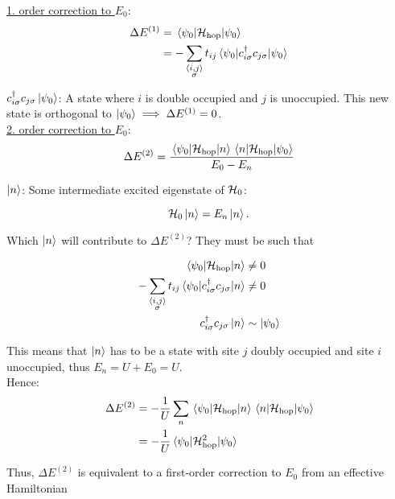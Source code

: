 \underline{1. order correction to $E_0$}:
\begin{align}
    \Delta E^{(1)} &= \mel{\psi_0}{\mathcal{H}_{\text{hop}}}{\psi_0} \\
    &= - \sum_{\substack{\langle i, j \rangle \\ \sigma}} t_{ij} \mel{\psi_0}{c_{i\sigma}^\dagger c_{j\sigma}}{\psi_0}
\end{align}

 $c_{i\sigma}^\dagger c_{j\sigma}\ket{{\psi_0}}$: A state where $i$ is double occupied and $j$ is unoccupied. This new state is orthogonal to $\ket{\psi_0} \implies \Delta E^{(1)} = 0$. \\

\underline{2. order correction to $E_0$}:
\begin{equation}
    \Delta E^{(2)} = \frac{\mel{\psi_0}{\mathcal{H}_{\text{hop}}}{n} \mel{n}{\mathcal{H}_{\text{hop}}}{\psi_0}}{E_0 - E_n}
\end{equation}

$\ket{n}$: Some intermediate excited eigenstate of $\mathcal{H}_0$:

\begin{equation}
    \mathcal{H}_0\ket{n} = E_n\ket{n}.
\end{equation}

Which $\ket{n}$ will contribute to $\Delta E^{(2)}$? They must be such that

\begin{align}
    \mel{\psi_0}{\mathcal{H}_{\text{hop}}}{n} &\ne 0 \\
    - \sum_{\substack{\langle i, j \rangle \\ \sigma}} t_{ij} \mel{\psi_0}{c_{i\sigma}^\dagger c_{j\sigma}}{n} & \ne 0 \\
    c_{i \sigma}^\dagger c_{j \sigma}\ket{n} & \sim \ket{\psi_0}
\end{align}

This means that $\ket{n}$ has to be a state with site $j$ doubly occupied and site $i$ unoccupied, thus $E_n = U + E_0 = U$.\\

Hence:
\begin{align}
    \Delta E^{(2)} &= -\frac{1}{U}\sum_n \mel{\psi_0}{\mathcal{H}_{\text{hop}}}{n}\mel{n}{\mathcal{H}_{\text{hop}}}{\psi_0} \\
    &= -\frac{1}{U} \mel{\psi_0}{\mathcal{H}_{\text{hop}}^2}{\psi_0}
\end{align}

Thus, $\Delta E^{(2)}$ is equivalent to a first-order correction to $E_0$ from an effective Hamiltonian

